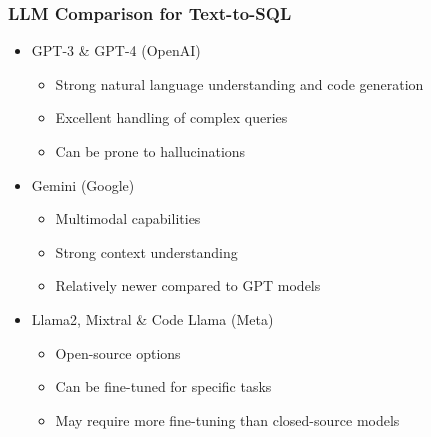 \begin{frame}\frametitle{LLM Comparison for Text-to-SQL}
      \begin{itemize}
        \item GPT-3 \& GPT-4 (OpenAI)
          \begin{itemize}
            \item Strong natural language understanding and code generation
            \item Excellent handling of complex queries
            \item Can be prone to hallucinations
          \end{itemize}
        \item Gemini (Google)
          \begin{itemize}
            \item Multimodal capabilities
            \item Strong context understanding
            \item Relatively newer compared to GPT models
          \end{itemize}
        \item Llama2, Mixtral \& Code Llama (Meta)
          \begin{itemize}
            \item Open-source options
            \item Can be fine-tuned for specific tasks
            \item May require more fine-tuning than closed-source models
          \end{itemize}
      \end{itemize}
\end{frame}
